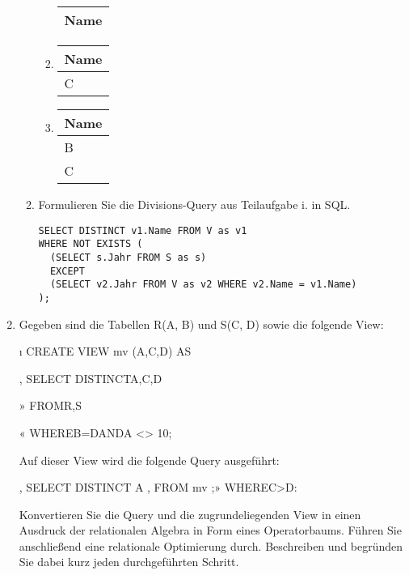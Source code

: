 \documentclass{bschlangaul-aufgabe}
\begin{document}
\begin{enumerate}
\begin{enumerate}
\begin{liAntwort}
\begin{enumerate}
\begin{tabular}{|l|}
\hline
Name \\\hline\hline
\end{tabular}

\item

\begin{tabular}{|l|}
\hline
Name \\\hline\hline
C \\\hline
\end{tabular}

\item

\begin{tabular}{|l|}
\hline
Name \\\hline\hline
B \\\hline
C \\\hline
\end{tabular}
\end{enumerate}
\end{liAntwort}


\item Formulieren Sie die Divisions-Query aus Teilaufgabe i. in SQL.

\begin{verbatim}
SELECT DISTINCT v1.Name FROM V as v1
WHERE NOT EXISTS (
  (SELECT s.Jahr FROM S as s)
  EXCEPT
  (SELECT v2.Jahr FROM V as v2 WHERE v2.Name = v1.Name)
);
\end{verbatim}

\end{enumerate}


\item Gegeben sind die Tabellen R(A, B) und S(C, D) sowie die folgende View:

ı CREATE VIEW mv (A,C,D) AS

, SELECT DISTINCTA,C,D

»  FROMR,S

« WHEREB=DANDA <> 10;

Auf dieser View wird die folgende Query ausgeführt:

, SELECT DISTINCT A
, FROM mv
;» WHEREC>D:

Konvertieren Sie die Query und die zugrundeliegenden View in einen
Ausdruck der relationalen Algebra in Form eines Operatorbaums. Führen
Sie anschließend eine relationale Optimierung durch. Beschreiben und
begründen Sie dabei kurz jeden durchgeführten Schritt.


\end{enumerate}
\end{document}
